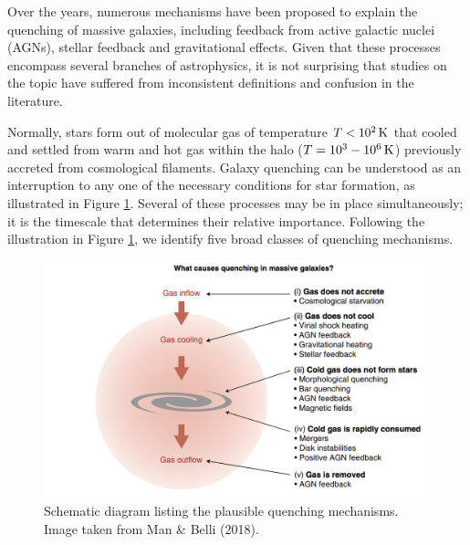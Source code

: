 \documentclass[a4paper,11pt]{article}
\begin{document}
{\noindent}Over the years, numerous mechanisms have been proposed to explain the quenching of massive galaxies, including feedback from active galactic nuclei (AGNs), stellar feedback and gravitational effects. Given that these processes encompass several branches of astrophysics, it is not surprising that studies on the topic have suffered from inconsistent definitions and confusion in the literature.

{\noindent}Normally, stars form out of molecular gas of temperature $T<10^2\,{\rm K}$ that cooled and settled from warm and hot gas within the halo ($T=10^3-10^6\,{\rm K}$) previously accreted from cosmological filaments. Galaxy quenching can be understood as an interruption to any one of the necessary conditions for star formation, as illustrated in Figure \ref{fig:quenching}. Several of these processes may be in place simultaneously; it is the timescale that determines their relative importance. Following the illustration in Figure \ref{fig:quenching}, we identify five broad classes of quenching mechanisms.

\begin{figure}[t]
    \centering
    \includegraphics[width=16cm]{figures/quenching.png}
    \caption{\footnotesize{Schematic diagram listing the plausible quenching mechanisms. Image taken from Man \& Belli (2018).}}
    \label{fig:quenching}
\end{figure}
\end{document}
